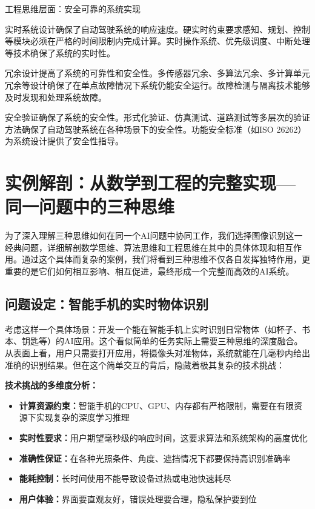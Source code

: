 工程思维层面：安全可靠的系统实现

实时系统设计确保了自动驾驶系统的响应速度。硬实时约束要求感知、规划、控制等模块必须在严格的时间限制内完成计算。实时操作系统、优先级调度、中断处理等技术确保了系统的实时性。

冗余设计提高了系统的可靠性和安全性。多传感器冗余、多算法冗余、多计算单元冗余等设计确保了在单点故障情况下系统仍能安全运行。故障检测与隔离技术能够及时发现和处理系统故障。

安全验证确保了系统的安全性。形式化验证、仿真测试、道路测试等多层次的验证方法确保了自动驾驶系统在各种场景下的安全性。功能安全标准（如ISO 26262）为系统设计提供了安全性指导。

\section{实例解剖：从数学到工程的完整实现---同一问题中的三种思维}

为了深入理解三种思维如何在同一个AI问题中协同工作，我们选择图像识别这一经典问题，详细解剖数学思维、算法思维和工程思维在其中的具体体现和相互作用。通过这个具体而复杂的案例，我们将看到三种思维不仅各自发挥独特作用，更重要的是它们如何相互影响、相互促进，最终形成一个完整而高效的AI系统。

\subsection{问题设定：智能手机的实时物体识别}

考虑这样一个具体场景：开发一个能在智能手机上实时识别日常物体（如杯子、书本、钥匙等）的AI应用。这个看似简单的任务实际上需要三种思维的深度融合。从表面上看，用户只需要打开应用，将摄像头对准物体，系统就能在几毫秒内给出准确的识别结果。但在这个简单交互的背后，隐藏着极其复杂的技术挑战：

\textbf{技术挑战的多维度分析：}
\begin{itemize}
\item \textbf{计算资源约束：}智能手机的CPU、GPU、内存都有严格限制，需要在有限资源下实现复杂的深度学习推理
\item \textbf{实时性要求：}用户期望毫秒级的响应时间，这要求算法和系统架构的高度优化
\item \textbf{准确性保证：}在各种光照条件、角度、遮挡情况下都要保持高识别准确率
\item \textbf{能耗控制：}长时间使用不能导致设备过热或电池快速耗尽
\item \textbf{用户体验：}界面要直观友好，错误处理要合理，隐私保护要到位
\end{itemize}

